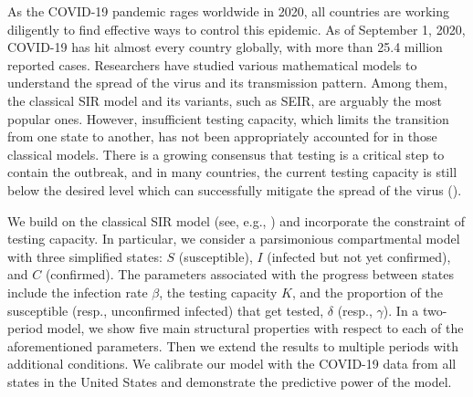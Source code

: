 \documentclass[nonblindrev, copyedit]{informs3a}
\newcounter{prop}[chapter]
\begin{document}
As the COVID-19 pandemic rages worldwide in 2020, all countries are working diligently to find effective ways to control this epidemic.
As of September 1, 2020, COVID-19 has hit almost every country globally, with more than 25.4 million reported cases. Researchers have studied various mathematical models to understand the spread of the virus and its transmission pattern. Among them, the classical SIR model and its variants, such as SEIR, are arguably the most popular ones. However, insufficient testing capacity, which limits the transition from one state to another, has not been appropriately accounted for in those classical models. There is a growing consensus that testing is a critical step to contain the outbreak, and in many countries, the current testing capacity is still below the desired level which can successfully mitigate the spread of the virus (\citealt{collins2020is}).

We build on the classical SIR model (see, e.g., \citealt{anderson1992infectious}) and incorporate the constraint of testing capacity.
In particular, we consider a parsimonious compartmental model with three simplified states: $S$ (susceptible), $I$ (infected but not yet confirmed), and $C$ (confirmed).
The parameters associated with the progress between states include the infection rate $\beta$, the testing capacity $K$, and the proportion of the susceptible (resp., unconfirmed infected) that get tested, $\delta$ (resp., $\gamma$).
In a two-period model, we show five main structural properties with respect to each of the aforementioned parameters.
Then we extend the results to multiple periods with additional conditions.
We calibrate our model with the COVID-19 data from all states in the United States and demonstrate the predictive power of the model.
\end{document}
